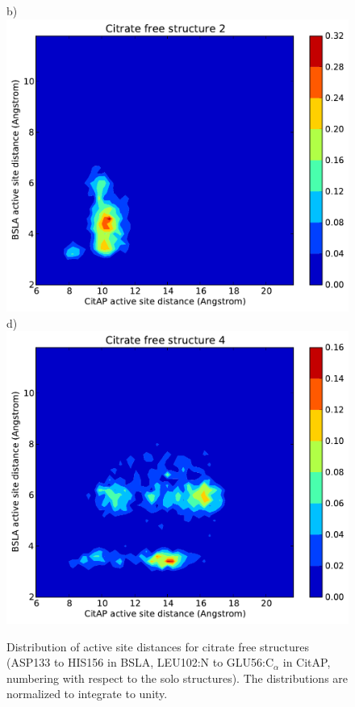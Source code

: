 \documentclass[english, a4paper, 12pt, titlepage, draft]{article}
\begin{document}
\begin{figure}
\begin{minipage}[]{0.45\linewidth}
    \end{minipage}
\hspace{0.5cm}
    \begin{minipage}[]{0.45\linewidth}
        \centering
        b)
        \includegraphics[width=\textwidth]{figures/CitAP_BSLA_distance/BSLA_CitAP_distance_free_contour_structure2.pdf}  
        d)
        \includegraphics[width=\textwidth]{figures/CitAP_BSLA_distance/BSLA_CitAP_distance_free_contour_structure4.pdf}  
    \end{minipage}
    \caption{Distribution of active site distances for citrate free structures (ASP133 to HIS156 in BSLA, LEU102:N to GLU56:C$_{\alpha}$ in CitAP, numbering with respect to the solo structures).
    The distributions are normalized to integrate to unity.}
\label{fig:active_site_free_distribution}
\end{figure}       
\end{document}
